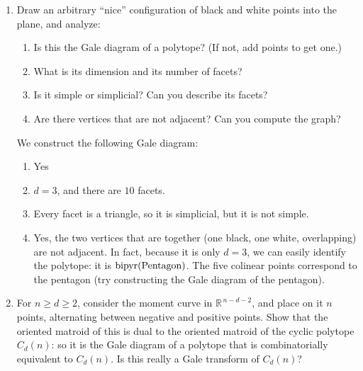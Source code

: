 \documentclass{article}
\begin{document}
\begin{enumerate}
\item Draw an arbitrary ``nice'' configuration of black and white points into the plane, and analyze:

\begin{enumerate}[label=(\roman*)]
\item Is this the Gale diagram of a polytope? (If not, add points to get one.)
\item What is its dimension and its number of facets?
\item Is it simple or simplicial? Can you describe its facets?
\item Are there vertices that are not adjacent? Can you compute the graph?
\end{enumerate}

\begin{solution}
We construct the following Gale diagram:

\begin{figure}[h]
    \centering
{}
\end{figure}

\begin{enumerate}[label=(\roman*)]
    \item Yes
    \item $d=3$, and there are $10$ facets.
    \item Every facet is a triangle, so it is simplicial, but it is not simple.
    \item Yes, the two vertices that are together (one black, one white, overlapping) are not adjacent. In fact, because it is only $d=3$, we can easily identify the polytope: it is $\operatorname{bipyr}(\textup{Pentagon)}$. The five colinear points correspond to the pentagon (try constructing the Gale diagram of the pentagon). 
\end{enumerate}
\end{solution}

\item For $n \ge d \ge 2$, consider the moment curve in $\mathbb{R}^{\,n-d-2}$, and place on it $n$ points, alternating between negative and positive points. Show that the oriented matroid of this is dual to the oriented matroid of the cyclic polytope $C_d(n)$: so it is the Gale diagram of a polytope that is combinatorially equivalent to $C_d(n)$. Is this really a Gale transform of $C_d(n)$?


\end{enumerate}
\end{document}
